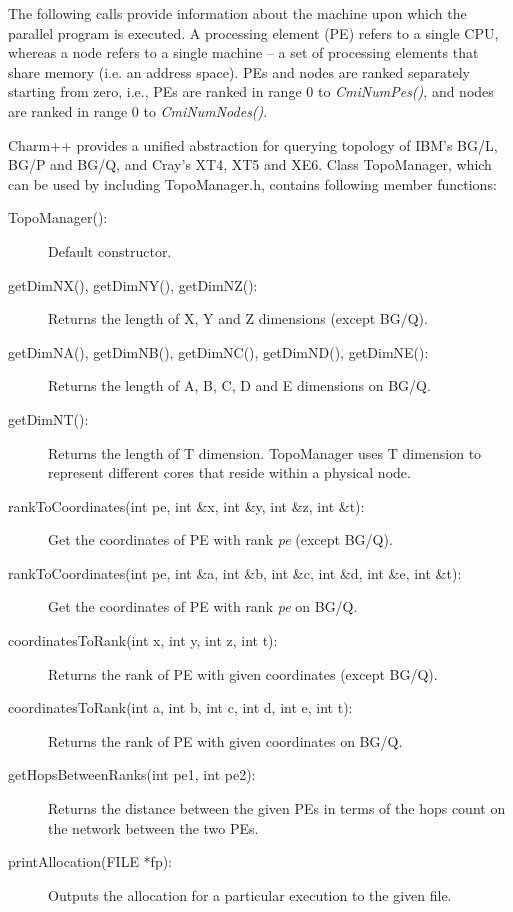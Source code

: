 The following calls provide information about the machine upon which the
parallel program is executed. A processing element (PE) refers to a single CPU,
whereas a node refers to a single machine -- a set of processing elements that share
memory (i.e. an address space).  PEs and nodes are ranked separately starting
from zero, i.e., PEs are ranked in range 0 to {\em CmiNumPes()}, and nodes are
ranked in range 0 to {\em CmiNumNodes()}.

Charm++ provides a unified abstraction for querying topology of IBM's BG/L, BG/P
and BG/Q, and Cray's XT4, XT5 and XE6. Class TopoManager, which can be used 
by including TopoManager.h, contains following member functions:

\begin{description}
\item [TopoManager():] Default constructor.
\item [getDimNX(), getDimNY(), getDimNZ():] Returns the length of X, Y and Z
dimensions (except BG/Q).
\item [getDimNA(), getDimNB(), getDimNC(), getDimND(), getDimNE():] Returns the
length of A, B, C, D and E dimensions on BG/Q.
\item [getDimNT():] Returns the length of T dimension. TopoManager uses T
dimension to represent different cores that reside within a physical node.
\item [rankToCoordinates(int pe, int \&x, int \&y, int \&z, int \&t):] Get the
coordinates of PE with rank {\em pe} (except BG/Q).
\item [rankToCoordinates(int pe, int \&a, int \&b, int \&c, int \&d, int \&e, int
\&t):] Get the coordinates of PE with rank {\em pe} on BG/Q.
\item [coordinatesToRank(int x, int y, int z, int t):] Returns the rank of PE
with given coordinates (except BG/Q).
\item [coordinatesToRank(int a, int b, int c, int d, int e, int t):] Returns the
rank of PE with given coordinates on BG/Q.
\item [getHopsBetweenRanks(int pe1, int pe2):] Returns the distance between the
given PEs in terms of the hops count on the network between the two PEs.
\item [printAllocation(FILE *fp):] Outputs the allocation for a particular
execution to the given file.
\end{description}

